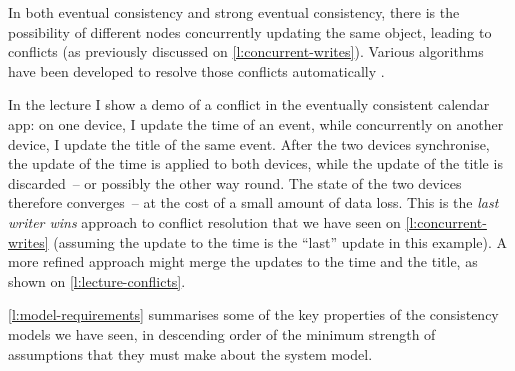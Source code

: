 In both eventual consistency and strong eventual consistency, there is the possibility of different nodes concurrently updating the same object, leading to conflicts (as previously discussed on \autoref{l:concurrent-writes}).
Various algorithms have been developed to resolve those conflicts automatically \citep{Shapiro:2011}.

In the lecture I show a demo of a conflict in the eventually consistent calendar app: on one device, I update the time of an event, while concurrently on another device, I update the title of the same event.
After the two devices synchronise, the update of the time is applied to both devices, while the update of the title is discarded~-- or possibly the other way round.
The state of the two devices therefore converges~-- at the cost of a small amount of data loss.
This is the \emph{last writer wins} approach to conflict resolution that we have seen on \autoref{l:concurrent-writes} (assuming the update to the time is the ``last'' update in this example).
A more refined approach might merge the updates to the time and the title, as shown on \autoref{l:lecture-conflicts}.

\autoref{l:model-requirements} summarises some of the key properties of the consistency models we have seen, in descending order of the minimum strength of assumptions that they must make about the system model.

